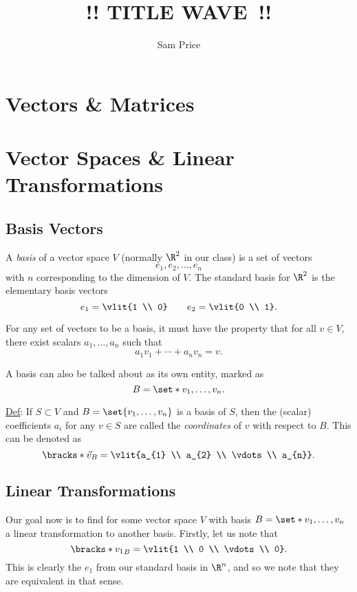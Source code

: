 \documentclass{article}
\author{Sam Price}
\date{}
\title{!! TITLE WAVE~!!}
\begin{document}
\maketitle

\section{Vectors \& Matrices}

\section{Vector Spaces \& Linear Transformations}
\subsection{Basis Vectors}

A \emph{basis} of a vector space $V$ (normally $\R^{2}$ in our class) is a set of vectors
\[ e_{1}, e_{2}, \ldots, e_{n} \]
with $n$ corresponding to the dimension of $V$. The standard basis for $\R^{2}$ is the elementary basis vectors
\[ e_{1} = \vlit{1 \\ 0} \qquad e_{2} = \vlit{0 \\ 1}.  \]

For any set of vectors to be a basis, it must have the property that for all $v \in V$, there exist
scalars $a_{1}, \ldots, a_{n}$ such that
\[ a_{1}v_{1} + \cdots + a_{n}v_{n} = v. \]

A basis can also be talked about as its own entity, marked as
\[ B = \set*{v_{1}, \ldots, v_{n}}. \]

\underline{Def}: If $S \subset V$ and $B = \set{v_{1}, \ldots, v_{n}}$ is a basis of $S$, then
the (scalar) coefficients $a_{i}$ for any $v \in S$ are called the \emph{coordinates} of $v$ with respect to $B$.
This can be denoted as
\[ \bracks*{\vec{v}}_{B} = \vlit{a_{1} \\ a_{2} \\ \vdots \\ a_{n}}. \]

\subsection{Linear Transformations}
Our goal now is to find for some vector space $V$ with basis $B = \set*{v_{1}, \ldots, v_{n}}$ a linear transformation to another basis.
Firstly, let us note that
\[ \bracks*{v_{1}}_{B} = \vlit{1 \\ 0 \\ \vdots \\ 0}. \]
This is clearly the $e_{1}$ from our standard basis in $\R^{n}$, and so we note that they are equivalent in that sense.
\end{document}
